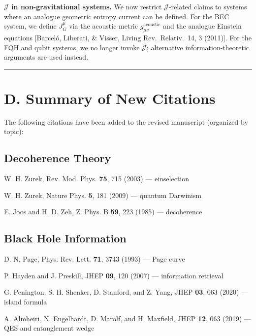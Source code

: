 \documentclass[11pt,a4paper]{article}
\begin{document}
\textbf{$\mathcal{J}$ in non-gravitational systems.} We now restrict $\mathcal{J}$-related claims to systems where an analogue geometric entropy current can be defined. For the BEC system, we define $J^\mu_G$ via the acoustic metric $g^{\text{acoustic}}_{\mu\nu}$ and the analogue Einstein equations [Barcel\'o, Liberati, \& Visser, Living Rev.\ Relativ.\ 14, 3 (2011)]. For the FQH and qubit systems, we no longer invoke $\mathcal{J}$; alternative information-theoretic arguments are used instead.

\vspace{1em}
\hrule
\vspace{1em}

\section*{D. Summary of New Citations}

The following citations have been added to the revised manuscript (organized by topic):

\subsection*{Decoherence Theory}
\begin{enumerate}[leftmargin=*,label={[D\arabic*]}]
\item W. H. Zurek, Rev. Mod. Phys. \textbf{75}, 715 (2003) --- einselection
\item W. H. Zurek, Nature Phys. \textbf{5}, 181 (2009) --- quantum Darwinism
\item E. Joos and H. D. Zeh, Z. Phys. B \textbf{59}, 223 (1985) --- decoherence
\end{enumerate}

\subsection*{Black Hole Information}
\begin{enumerate}[leftmargin=*,resume,label={[D\arabic*]}]
\item D. N. Page, Phys. Rev. Lett. \textbf{71}, 3743 (1993) --- Page curve
\item P. Hayden and J. Preskill, JHEP \textbf{09}, 120 (2007) --- information retrieval
\item G. Penington, S. H. Shenker, D. Stanford, and Z. Yang, JHEP \textbf{03}, 063 (2020) --- island formula
\item A. Almheiri, N. Engelhardt, D. Marolf, and H. Maxfield, JHEP \textbf{12}, 063 (2019) --- QES and entanglement wedge
\end{enumerate}
\end{document}
